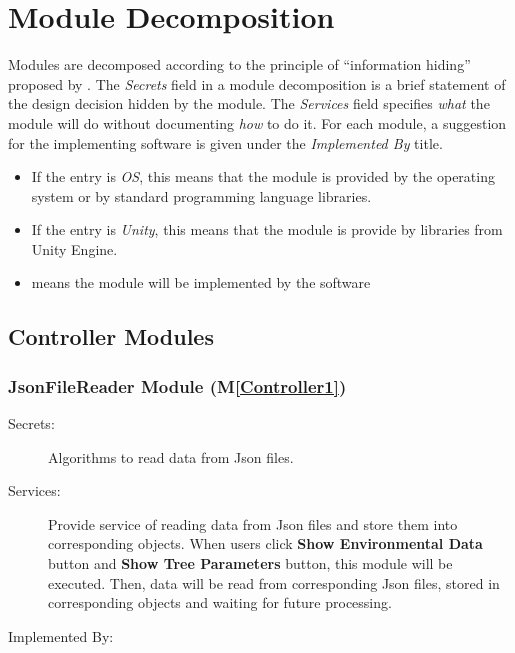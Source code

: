 \documentclass[12pt, titlepage]{article}
\newcommand{\mref}[1]{M\ref{#1}}
\begin{document}
\section{Module Decomposition} \label{SecMD}

Modules are decomposed according to the principle of ``information hiding''
proposed by \citet{ParnasEtAl1984}. The \emph{Secrets} field in a module
decomposition is a brief statement of the design decision hidden by the
module. The \emph{Services} field specifies \emph{what} the module will do
without documenting \emph{how} to do it. For each module, a suggestion for the
implementing software is given under the \emph{Implemented By} title. 

\begin{itemize}
\item If the
entry is \emph{OS}, this means that the module is provided by the operating
system or by standard programming language libraries. 

\item If the entry is \emph{Unity}, this means that the module is provide by libraries from
Unity Engine.

\item \emph{\progname{}} means the
module will be implemented by the \progname{} software
\end{itemize}


\subsection{Controller Modules}
\newcommand\bt{\textbf{Start}}
\subsubsection{JsonFileReader Module (\mref{Controller1})}
\begin{description}
\item[Secrets:] Algorithms to read data from Json files.
\item[Services:] Provide service of reading data from Json files and store them into 
corresponding objects. When users click \textbf{Show Environmental Data} button and 
\textbf{Show Tree Parameters} button, this module will be executed. Then, data will be read
from corresponding Json files, stored in corresponding objects and waiting for future 
processing. 
\item[Implemented By:] \progname{}
\end{description}
\end{document}
